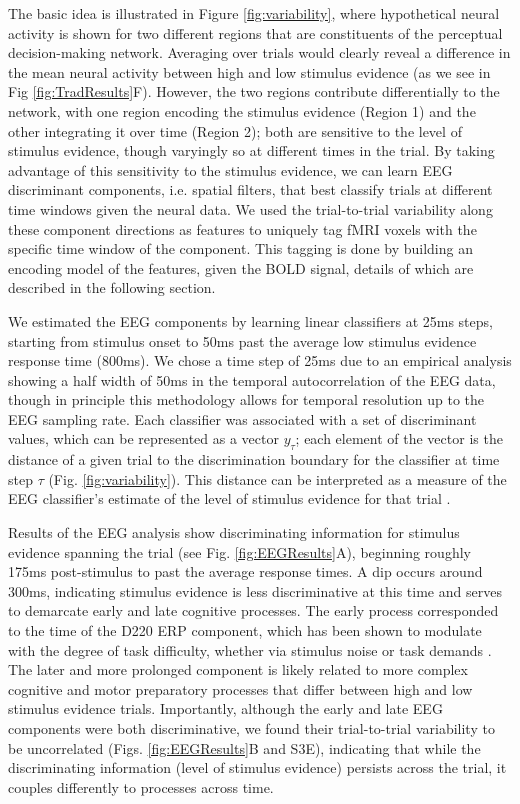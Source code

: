 The basic idea is illustrated in Figure \ref{fig:variability}, where hypothetical neural activity is shown for two different regions that are constituents of the perceptual decision-making network. Averaging over trials would clearly reveal a difference in the mean neural activity between high and low stimulus evidence (as we see in Fig \ref{fig:TradResults}F). However, the two regions contribute differentially to the network, with one region encoding the stimulus evidence (Region 1) and the other integrating it over time (Region 2); both are sensitive to the level of stimulus evidence, though varyingly so at different times in the trial.  By taking advantage of this sensitivity to the stimulus evidence, we can learn EEG discriminant components, i.e. spatial filters, that best classify trials at different time windows given the neural data.  We used the trial-to-trial variability along these component directions as features to uniquely tag fMRI voxels with the specific time window of the component. This tagging is done by building an encoding model of the features, given the BOLD signal, details of which are described in the following section.

We estimated the EEG components by learning linear classifiers at 25ms steps, starting from stimulus onset to 50ms past the average low stimulus evidence response time (800ms).  We chose a time step of 25ms due to an empirical analysis showing a half width of 50ms in the temporal autocorrelation of the EEG data, though in principle this methodology allows for temporal resolution up to the EEG sampling rate. Each classifier was associated with a set of discriminant values, which can be represented as a vector $y_{\tau}$; each element of the vector is the distance of a given trial to the discrimination boundary for the classifier at time step $\tau$ (Fig. \ref{fig:variability}). This distance can be interpreted as a measure of the EEG classifier's estimate of the level of stimulus evidence for that trial \cite{Goldman2009,Muraskin2015,Parra2005,Sajda2009,Sherwin2012,Walz2013}.

Results of the EEG analysis show discriminating information for stimulus evidence spanning the trial (see Fig. \ref{fig:EEGResults}A), beginning roughly 175ms post-stimulus to past the average response times.  A dip occurs around 300ms, indicating stimulus evidence is less discriminative at this time and serves to demarcate early and late cognitive processes. The early process corresponded to the time of the D220 ERP component, which has been shown to modulate with the degree of task difficulty, whether via stimulus noise or task demands \cite{Philiastides2006}. The later and more prolonged component is likely related to more complex cognitive and motor preparatory processes that differ between high and low stimulus evidence trials.  Importantly, although the early and late EEG components were both discriminative, we found their trial-to-trial variability to be uncorrelated (Figs. \ref{fig:EEGResults}B and S3E), indicating that while the discriminating information (level of stimulus evidence) persists across the trial, it couples differently to processes across time. 

